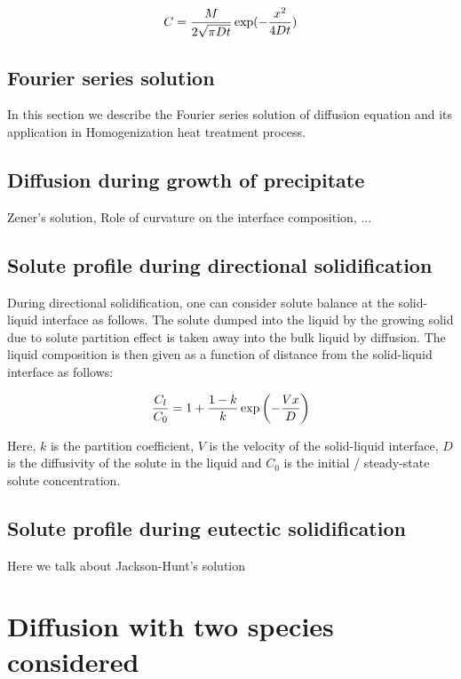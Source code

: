 $$ C = {M \over 2 \sqrt{\pi D t}} \exp(-{x^2 \over 4Dt}) $$


\subsection{Fourier series solution}

In this section we describe the Fourier series solution of diffusion equation and its application in Homogenization heat treatment process.

\subsection{Diffusion during growth of precipitate}

Zener's solution, Role of curvature on the interface composition, ...

\subsection{Solute profile during directional solidification}

During directional solidification, one can consider solute balance at the solid-liquid interface as follows. The solute dumped into the liquid by the growing solid due to solute partition effect is taken away into the bulk liquid by diffusion. The liquid composition is then given as a function of distance from the solid-liquid interface as follows:

\begin{equation}
{C_l \over C_0} = 1 + {1-k\over k} \exp{\left(- {Vx \over D}\right)}
\end{equation}

Here, $k$ is the partition coefficient, $V$ is the velocity of the solid-liquid interface, $D$ is the diffusivity of the solute in the liquid and $C_0$ is the initial / steady-state solute concentration.

\subsection{Solute profile during eutectic solidification}

Here we talk about Jackson-Hunt's solution

\section{Diffusion with two species considered}

